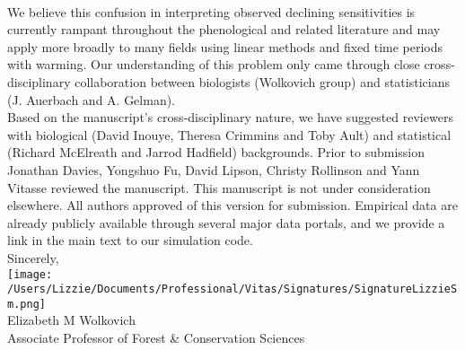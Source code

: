 \documentclass[11pt,a4paper]{article}
\begin{document}
\vspace{1.5ex}\\
We believe this confusion in interpreting observed declining sensitivities is currently rampant throughout the phenological \citep[e.g.,][]{fu2015,Samplonius:2018aa,meng2020} and related literature \citep[e.g.,][]{piao2017} and may apply more broadly to many fields using linear methods and fixed time periods with warming. Our understanding of this problem only came through close cross-disciplinary collaboration between biologists (Wolkovich group) and statisticians (J. Auerbach and A. Gelman). 
\vspace{1.5ex}\\
Based on the manuscript's cross-disciplinary nature, we have suggested reviewers with biological (David Inouye, Theresa Crimmins and Toby Ault) and statistical (Richard McElreath and Jarrod Hadfield) backgrounds. Prior to submission Jonathan Davies, Yongshuo Fu, David Lipson, Christy Rollinson and Yann Vitasse reviewed the manuscript. This manuscript is not under consideration elsewhere. All authors approved of this version for submission. Empirical data are already publicly available through several major data portals, and we provide a link in the main text to our simulation code. %
\vspace{1.5ex}\\
Sincerely,\\

\texttt{[image: /Users/Lizzie/Documents/Professional/Vitas/Signatures/SignatureLizzieSm.png]} \\

\noindent Elizabeth M Wolkovich\\
Associate Professor of Forest \& Conservation Sciences\\ 

\newpage

\end{document}
